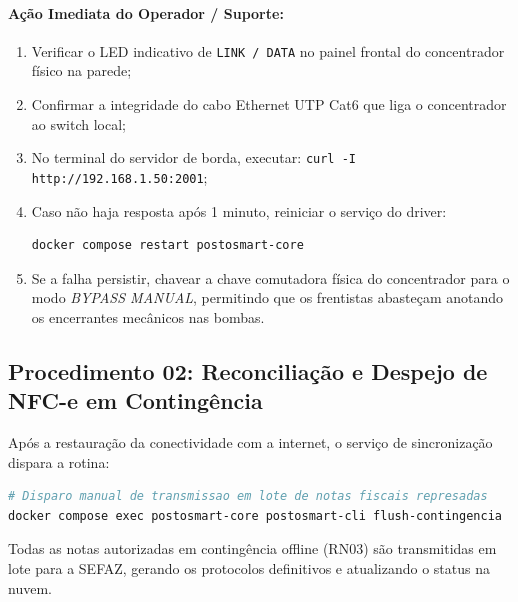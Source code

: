 \paragraph{Ação Imediata do Operador / Suporte:}
\begin{enumerate}
    \item Verificar o LED indicativo de \texttt{LINK / DATA} no painel frontal do concentrador físico na parede;
    \item Confirmar a integridade do cabo Ethernet UTP Cat6 que liga o concentrador ao switch local;
    \item No terminal do servidor de borda, executar: \texttt{curl -I http://192.168.1.50:2001};
    \item Caso não haja resposta após 1 minuto, reiniciar o serviço do driver:
    \begin{lstlisting}[language=bash]
    docker compose restart postosmart-core
    \end{lstlisting}
    \item Se a falha persistir, chavear a chave comutadora física do concentrador para o modo \textit{BYPASS MANUAL}, permitindo que os frentistas abasteçam anotando os encerrantes mecânicos nas bombas.
\end{enumerate}

\subsection{Procedimento 02: Reconciliação e Despejo de NFC-e em Contingência}
Após a restauração da conectividade com a internet, o serviço de sincronização dispara a rotina:
\begin{lstlisting}[language=bash]
# Disparo manual de transmissao em lote de notas fiscais represadas
docker compose exec postosmart-core postosmart-cli flush-contingencia
\end{lstlisting}
Todas as notas autorizadas em contingência offline (RN03) são transmitidas em lote para a SEFAZ, gerando os protocolos definitivos e atualizando o status na nuvem.
